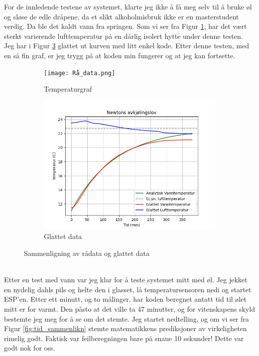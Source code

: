 \documentclass{article}
\begin{document}
For de innledende testene av systemet, klarte jeg ikke å få meg selv til å bruke øl og sløse de edle dråpene, da et slikt alkoholmisbruk ikke er en masterstudent verdig. Da ble det kaldt vann fra springen.
Som vi ser fra Figur \ref{fig:temperaturgraf}, har det vært sterkt varierende lufttemperatur på en dårlig isolert hytte under denne testen. Jeg har i Figur \ref{fig:glattet} glattet ut kurven med litt enkel kode. Etter denne testen, med en så fin graf, er jeg trygg på at koden min fungerer og at jeg kan fortsette.
\begin{figure}[h!]
    \centering
    \begin{subfigure}[b]{0.45\textwidth}
        \centering
        \texttt{[image: Rå\_data.png]}
        \caption{Temperaturgraf}
        \label{fig:temperaturgraf}
    \end{subfigure}
    \hfill
    \begin{subfigure}[b]{0.45\textwidth}
        \centering
        \includegraphics[width=\textwidth]{Glattet_data.png}
        \caption{Glattet data}
        \label{fig:glattet}
    \end{subfigure}
    \caption{Sammenligning av rådata og glattet data}
\end{figure}\\
Etter en test med vann var jeg klar for å teste systemet mitt med øl. Jeg jekket en nydelig dahls pils og helte den i glasset, lå temperatursensoren nedi og startet ESP'en. Etter ett minutt, og to målinger, har koden beregnet antatt tid til ølet mitt er for varmt. Den påsto at det ville ta 47 minutter, og for vitenskapens skyld bestemte jeg meg for å se om det stemte. Jeg startet nedtelling, og om vi ser fra Figur \ref{fig:tid_sammenlikn} stemte matematikkens prediksjoner av virkeligheten rimelig godt. Faktisk var feilberegningen bare på snaue 10 sekunder! Dette var godt nok for oss.
\end{document}
